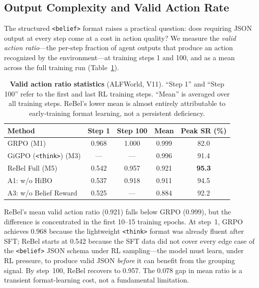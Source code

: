 \subsection{Output Complexity and Valid Action Rate}
\label{sec:valid_action}

The structured \texttt{<belief>} format raises a practical question: does requiring
JSON output at every step come at a cost in action quality?
We measure the \textit{valid action ratio}---the per-step fraction of agent
outputs that produce an action recognized by the environment---at training
steps 1 and 100, and as a mean across the full training run
(Table~\ref{tab:valid_action}).

\begin{table}[t]
  \centering
  \caption{%
    \textbf{Valid action ratio statistics} (ALFWorld, V11).
    ``Step 1'' and ``Step 100'' refer to the first and last RL training steps.
    ``Mean'' is averaged over all training steps.
    ReBel's lower mean is almost entirely attributable to early-training format
    learning, not a persistent deficiency.
  }
  \label{tab:valid_action}
  \vspace{4pt}
  \small
  \renewcommand{\arraystretch}{1.15}
  \begin{tabular}{@{}lcccc@{}}
    \toprule
    \textbf{Method} & \textbf{Step 1} & \textbf{Step 100} & \textbf{Mean} & \textbf{Peak SR (\%)} \\
    \midrule
    GRPO (M1)              & 0.968          & 1.000          & 0.999         & 82.0 \\
    GiGPO (\texttt{<think>}) (M3) & ---    & ---            & 0.996         & 91.4 \\
    ReBel Full (M5)        & 0.542          & 0.957          & 0.921         & \textbf{95.3} \\
    A1: w/o HiBO           & 0.537          & 0.918          & 0.911         & 94.5 \\
    A3: w/o Belief Reward  & 0.525          & ---            & 0.884         & 92.2 \\
    \bottomrule
  \end{tabular}
\end{table}

ReBel's mean valid action ratio (0.921) falls below GRPO (0.999), but the difference
is concentrated in the first 10--15 training epochs.
At step~1, GRPO achieves 0.968 because the lightweight \texttt{<think>} format was
already fluent after SFT; ReBel starts at 0.542 because the SFT data did not cover
every edge case of the \texttt{<belief>} JSON schema under RL sampling---the model
must learn, under RL pressure, to produce valid JSON \emph{before} it can benefit
from the grouping signal.
By step~100, ReBel recovers to 0.957.
The 0.078 gap in mean ratio is a transient format-learning cost, not a fundamental
limitation.

